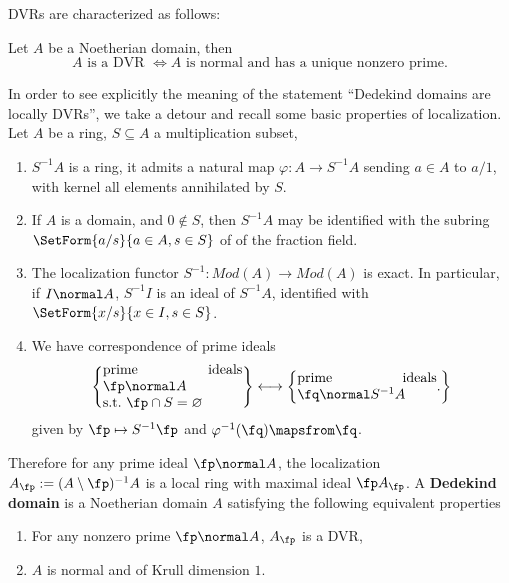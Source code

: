 \documentclass[11pt]{amsart}
\begin{document}

DVRs are characterized as follows:

\begin{lem}
    Let $A$ be a Noetherian domain, then
    \[
        A \text{ is a DVR } \iff
        A \text{ is normal and has a unique nonzero prime.}
    \]
\end{lem}


In order to see explicitly the meaning of the statement ``Dedekind domains are
locally DVRs'', we take a detour and recall some basic properties of
localization.  Let $A$ be a ring, $S \subseteq A$ a multiplication subset,

\begin{enumerate}
    \item $S^{-1} A$ is a ring, it admits a natural map $\varphi: A \to S^{-1}A$
        sending $a \in A$ to $a/1$, with kernel all elements annihilated by
        $S$.
    \item If $A$ is a domain, and $0 \not\in S$, then $S^{-1} A$ may be
        identified with the subring $ \SetForm{a/s}{a \in A, s \in S} $ of of
        the fraction field.
    \item The localization functor $S^{-1} : Mod(A) \to Mod(A)$ is exact.  In
        particular, if $I \normal A$, $S^{-1}I$ is an ideal of $S^{-1}A$,
        identified with $ \SetForm{x/s}{x \in I, s \in S} $.
    \item We have correspondence of prime ideals
        \[
            \left\{\parbox{10em}{prime ideals $\fp \normal A$
                    s.t.~$\fp \cap S = \varnothing$}\right\}
            \longleftrightarrow
            \left\{\parbox{10em}{prime ideals $\fq \normal S^{-1}A$}.
            \right\}
        \]
        given by $\fp \mapsto S^{-1} \fp$ and $\varphi^{-1}(\fq) \mapsfrom \fq$.
\end{enumerate}

Therefore for any prime ideal $\fp \normal A$, the localization $A_{\fp} := (A
\setminus \fp)^{-1}A$ is a local ring with maximal ideal $\fp A_{\fp}$.  A
 {\bf Dedekind domain} is a Noetherian domain $A$ satisfying
the following equivalent properties

\begin{enumerate}
    \item For any nonzero prime $\fp \normal A$, $A_{\fp}$ is a DVR,
    \item $A$ is normal and of Krull dimension $1$.
\end{enumerate}
\end{document}

